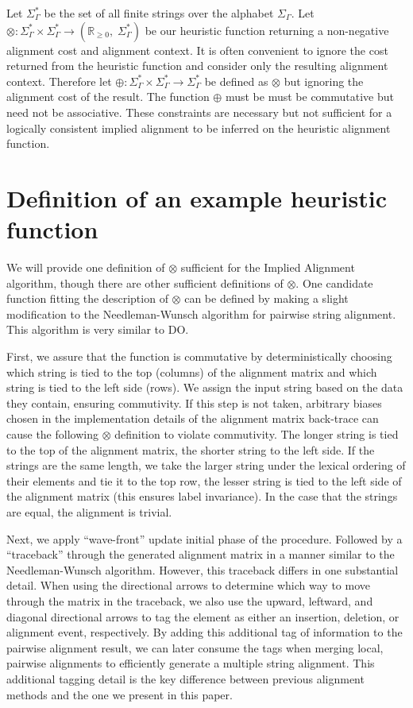 \documentclass[11pt]{article}
\newcommand*\NonNegReals{\mathbb{R}_{\geq 0}}
\begin{document}
Let $\Sigma^{*}_{\Gamma}$ be the set of all finite strings over the alphabet $\Sigma_{\Gamma}$.
Let $\otimes : \Sigma^{*}_{\Gamma} \times \Sigma^{*}_{\Gamma} \rightarrow \left(\NonNegReals,\; \Sigma^{*}_{\Gamma}\right)$ be our heuristic function returning a non-negative alignment cost and alignment context.
It is often convenient to ignore the cost returned from the heuristic function and consider only the resulting alignment context.
Therefore let $\oplus : \Sigma^{*}_{\Gamma} \times \Sigma^{*}_{\Gamma} \rightarrow \Sigma^{*}_{\Gamma}$ be defined as $\otimes$ but ignoring the alignment cost of the result.
The function $\oplus$ must be must be commutative but need not be associative.
These constraints are necessary but not sufficient for a logically consistent implied alignment to be inferred on the heuristic alignment function.

\section{Definition of an example heuristic function}
We will provide one definition of $\otimes$ sufficient for the Implied Alignment algorithm, though there are other sufficient definitions of $\otimes$.
One candidate function fitting the description of $\otimes$ can be defined by making a slight modification to the Needleman-Wunsch \citep{Needleman1970} algorithm for pairwise string alignment.
This algorithm is very similar to DO.

First, we assure that the function is commutative by deterministically choosing which string is tied to the top (columns) of the alignment matrix and which string is tied to the left side (rows).
We assign the input string based on the data they contain, ensuring commutivity.
If this step is not taken, arbitrary biases chosen in the implementation details of the alignment matrix back-trace can cause the following $\otimes$ definition to violate commutivity.
The longer string is tied to the top of the alignment matrix, the shorter string to the left side.
If the strings are the same length, we take the larger string under the lexical ordering of their elements and tie it to the top row, the lesser string is tied to the left side of the alignment matrix (this ensures label invariance). 
In the case that the strings are equal, the alignment is trivial.

Next, we apply ``wave-front'' update initial phase of the procedure.
Followed by a ``traceback'' through the generated alignment matrix in a manner similar to the Needleman-Wunsch algorithm.
However, this traceback differs in one substantial detail.
When using the directional arrows to determine which way to move through the matrix in the traceback, we also use the upward, leftward, and diagonal directional arrows to tag the element as either an insertion, deletion, or alignment event, respectively. 
By adding this additional tag of information to the pairwise alignment result, we can later consume the tags when merging local, pairwise alignments to efficiently generate a multiple string alignment.
This additional tagging detail is the key difference between previous alignment methods and the one we present in this paper.
\end{document}
